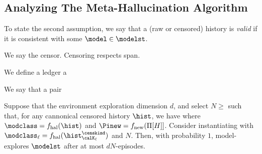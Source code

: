 \newcommand{\fnew}{f_{\mathrm{new}}}
\newcommand{\fhal}{f_{\mathrm{hal}}}

\subsection{Analyzing The Meta-Hallucination Algorithm}


To state the second assumption, we say that a (raw or censored) history is \emph{valid} if it is consistent with some $\model \in \modelst$.


\begin{definition} We say the censor. Censoring respects span. 
\end{definition}

We define a ledger a



\begin{definition} We say that a pair 
\end{definition}

\begin{theorem} Suppose that the environment exploration dimension $d$, and select $N \ge$ such that, for any cannonical censored history $\hist$, we have 
where $\modclass = \fhal(\hist)$ and $\Pinew = \fnew(\Pi[H]]$. Consider instantiating   with $\modclass_{\ell} = \fhal(\histcens_{\calK_{\ell}})$ and $N$. Then, with probability $1$,  model-explores $\modelst$ after at most $dN$-episodes.
\end{theorem}







